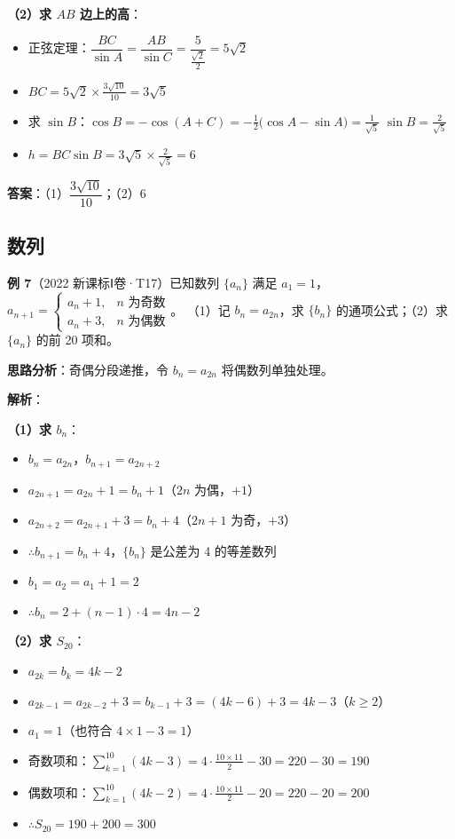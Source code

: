 \textbf{（2）求 $AB$ 边上的高}：
\begin{itemize}
  \item 正弦定理：$\dfrac{BC}{\sin A} = \dfrac{AB}{\sin C} = \dfrac{5}{\frac{\sqrt{2}}{2}} = 5\sqrt{2}$
  \item $BC = 5\sqrt{2} \times \frac{3\sqrt{10}}{10} = 3\sqrt{5}$
  \item 求 $\sin B$：$\cos B = -\cos(A+C) = -\frac12\big(\cos A - \sin A\big) = \frac{1}{\sqrt{5}}$
    $\sin B = \frac{2}{\sqrt{5}}$
  \item $h = BC\sin B = 3\sqrt{5} \times \frac{2}{\sqrt{5}} = 6$
\end{itemize}

\textbf{答案}：（1）$\boxed{\dfrac{3\sqrt{10}}{10}}$；（2）$\boxed{6}$

\subsection{数列}

\textbf{例 7}（2022 新课标Ⅰ卷·T17）已知数列 $\{a_n\}$ 满足 $a_1=1$，$a_{n+1} = \begin{cases}a_n+1, & n\text{ 为奇数} \\ a_n+3, & n\text{ 为偶数}\end{cases}$。
（1）记 $b_n = a_{2n}$，求 $\{b_n\}$ 的通项公式；（2）求 $\{a_n\}$ 的前 20 项和。

\textbf{思路分析}：奇偶分段递推，令 $b_n=a_{2n}$ 将偶数列单独处理。

\textbf{解析}：

\textbf{（1）求 $b_n$}：
\begin{itemize}
  \item $b_n = a_{2n}$，$b_{n+1} = a_{2n+2}$
  \item $a_{2n+1} = a_{2n} + 1 = b_n + 1$（$2n$ 为偶，$+1$）
  \item $a_{2n+2} = a_{2n+1} + 3 = b_n + 4$（$2n+1$ 为奇，$+3$）
  \item $\therefore b_{n+1} = b_n + 4$，$\{b_n\}$ 是公差为 4 的等差数列
  \item $b_1 = a_2 = a_1 + 1 = 2$
  \item $\therefore b_n = 2 + (n-1)\cdot 4 = 4n - 2$
\end{itemize}

\textbf{（2）求 $S_{20}$}：
\begin{itemize}
  \item $a_{2k} = b_k = 4k-2$
  \item $a_{2k-1} = a_{2k-2} + 3 = b_{k-1} + 3 = (4k-6)+3 = 4k-3$（$k\ge 2$）
  \item $a_1 = 1$（也符合 $4\times 1-3 = 1$）
  \item 奇数项和：$\sum_{k=1}^{10}(4k-3) = 4\cdot\frac{10\times11}{2} - 30 = 220 - 30 = 190$
  \item 偶数项和：$\sum_{k=1}^{10}(4k-2) = 4\cdot\frac{10\times11}{2} - 20 = 220 - 20 = 200$
  \item $\therefore S_{20} = 190 + 200 = 300$
\end{itemize}

